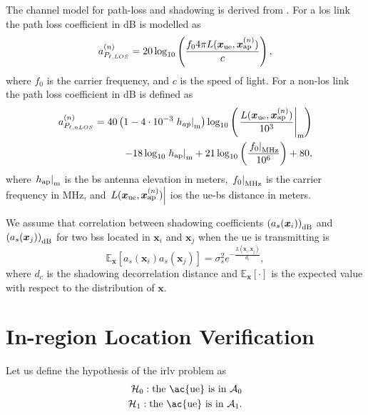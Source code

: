 \documentclass[conference,draftcls,onecolumn]{IEEEtran}
\newcommand{\E}[2]{\mathbb{E}_{#1}\left[#2\right]}
\begin{document}
The channel model for path-loss and shadowing is derived from \cite{3gpp}. For a \ac{los} link the path loss coefficient in dB is modelled as
\begin{equation}\label{eq:los}
    a_{P_{\ell,LOS}}^{(n)} = 20\log_{10}\left(\frac{f_0 4\pi L(\bm{x}_{\rm ue},\bm{x}_{\rm ap}^{(n)})}{c}\right),
\end{equation}
where $f_0$ is the carrier frequency, and $c$ is the speed of light. For a  non-\ac{los} link the path loss coefficient in dB is defined as
\begin{equation}
\begin{split}
    a_{P_{\ell, nLOS}}^{(n)} = 40\left(1-4 \cdot 10^{-3} \left. h_{ap} \right|_{\rm m} \right) \log_{10}\left (\left.\frac{L(\bm{x}_{\rm ue},\bm{x}_{\rm ap}^{(n)})}{10^3}\right|_{\rm m}\right ) \\
    -18\log_{10}\left.h_{\rm ap}\right|_{\rm m}
    + 21\log_{10}\left(\frac{\left.f_0\right|_{\rm MHz}}{10^6}\right) + 80,
    \end{split}
\end{equation}
where $\left.h_{\rm ap}\right|_{\rm m}$ is the \ac{bs} antenna elevation in meters, $\left. f_0 \right|_{\rm MHz}$ is the carrier frequency in MHz, and $\left. L(\bm{x}_{\rm ue},\bm{x}_{\rm ap}^{(n)})\right|$ ios the \ac{ue}-\ac{bs} distance in meters.

We assume that correlation between shadowing coefficients $\left( a_{s}(\bm{x}_i)\right)_{\rm dB}$ and $\left( a_{s}(\bm{x}_j)\right)_{\rm dB}$ for two \acp{bs} located in $\bm{x}_i$ and $\bm{x}_j$ when the \ac{ue} is transmitting is
\begin{equation}\label{eq: coor mat}
    \E{\bm x}{a_{s}(\bm{x}_i)a_{s}(\bm{x}_j)} = \sigma_s^2e^{-\frac{L(\bm{x}_i,\bm{x}_j)}{d_c}},
\end{equation}
where $d_c$ is the shadowing decorrelation distance and $\E{\bm x}{\cdot}$ is the expected value with respect to the distribution of $\bm x$.


\section{In-region Location Verification}\label{sec: ml}
Let us define the hypothesis of the \ac{irlv} problem as
 \begin{equation}
\begin{split}
  \mathcal H_0: \mbox{the \ac{ue} is in $\mathcal{A}_0$} \\
  \mathcal H_1: \mbox{the \ac{ue} is in $\mathcal{A}_1$}. 
  \end{split}
\end{equation}
\end{document}
